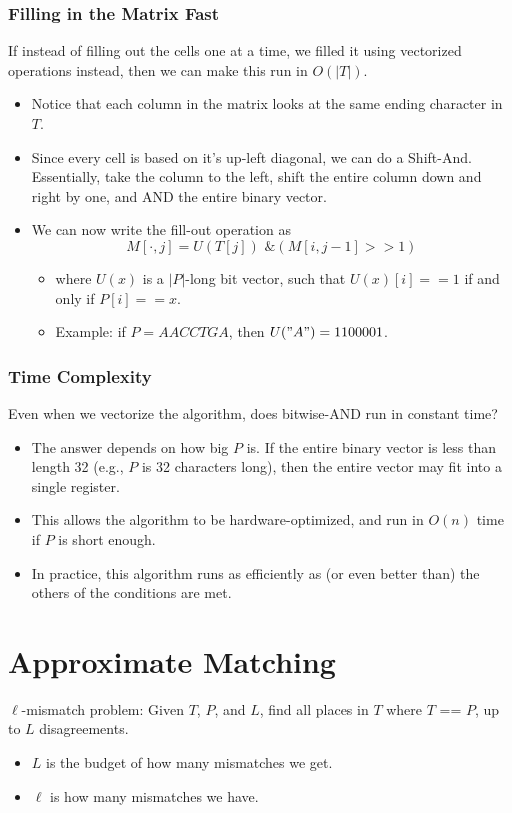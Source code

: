 \documentclass[10pt]{article}
\begin{document}
\subsubsection*{Filling in the Matrix Fast}
If instead of filling out the cells one at a time, we filled it using vectorized operations instead, then we can make this run in $O(|T|)$.
\begin{itemize}
	\item Notice that each column in the matrix looks at the same ending character in $T$.
	\item Since every cell is based on it's up-left diagonal, we can do a Shift-And.  Essentially, take the column to the left, shift the entire column down and right by one, and AND the entire binary vector.
	\item We can now write the fill-out operation as
	\[M[\cdot, j] = U(T[j]) \texttt{ \& } (M[i, j - 1] >> 1)\]
    \begin{itemize}
	    \item where $U(x)$ is a $|P|$-long bit vector, such that $U(x)[i] == 1$ if and only if $P[i] == x$. 
	    \item Example: if $P = AACCTGA$, then $U("A") = 1100001$.
    \end{itemize}
\end{itemize}

\subsubsection*{Time Complexity}
Even when we vectorize the algorithm, does bitwise-AND run in constant time?
\begin{itemize}
	\item The answer depends on how big $P$ is.  If the entire binary vector is less than length 32 (e.g., $P$ is 32 characters long), then the entire vector may fit into a single register.
	\item This allows the algorithm to be hardware-optimized, and run in $O(n)$ time if $P$ is short enough.
	\item In practice, this algorithm runs as efficiently as (or even better than) the others of the conditions are met.
\end{itemize}

\section*{Approximate Matching}
$\ell$-mismatch problem: Given $T$, $P$, and $L$, find all places in $T$ where $T$ == $P$, up to $L$ disagreements.
\begin{itemize}
	\item $L$ is the budget of how many mismatches we get.
	\item $\ell$ is how many mismatches we have.
\end{itemize}
\end{document}
